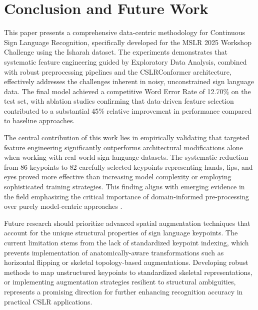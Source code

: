 \section{{Conclusion and Future Work}} 
\label{sec:formatting}
This paper presents a comprehensive data-centric methodology for Continuous Sign Language Recognition, specifically developed for the MSLR 2025 Workshop Challenge using the Isharah dataset. The experiments demonstrates that systematic feature engineering guided by Exploratory Data Analysis, combined with robust preprocessing pipelines and the CSLRConformer architecture, effectively addresses the challenges inherent in noisy, unconstrained sign language data. The final model achieved a competitive Word Error Rate of 12.70\% on the test set, with ablation studies confirming that data-driven feature selection contributed to a substantial 45\% relative improvement in performance compared to baseline approaches. 

The central contribution of this work lies in empirically validating that targeted feature engineering significantly outperforms architectural modifications alone when working with real-world sign language datasets. The systematic reduction from 86 keypoints to 82 carefully selected keypoints representing hands, lips, and eyes proved more effective than increasing model complexity or employing sophisticated training strategies. This finding aligns with emerging evidence in the field emphasizing the critical importance of domain-informed pre-processing over purely model-centric approaches \cite{preprocessing_keypoint_sign}. 

Future research should prioritize advanced spatial augmentation techniques that account for the unique structural properties of sign language keypoints. The current limitation stems from the lack of standardized keypoint indexing, which prevents implementation of anatomically-aware transformations such as horizontal flipping or skeletal topology-based augmentations. Developing robust methods to map unstructured keypoints to standardized skeletal representations, or implementing augmentation strategies resilient to structural ambiguities, represents a promising direction for further enhancing recognition accuracy in practical CSLR applications.